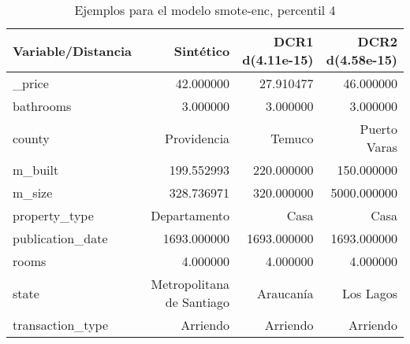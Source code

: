 \begin{table}[H]
\centering
\fontsize{10}{14}\selectfont
\caption{Ejemplos para el modelo smote-enc, percentil 4}
\label{table-example-economicos-b-3-smote-enc-4p}
\begin{tabular}{|l|r|r|r|}
\hline
\rowcolor[gray]{0.8}
Variable/Distancia & Sintético & DCR1 d(4.11e-15) & DCR2 d(4.58e-15) \\
\hline \_price & \cellcolor[rgb]{0.9, 0.54, 0.52} 42.000000 & 27.910477 & 46.000000 \\
\hline bathrooms & \cellcolor[rgb]{0.9, 0.54, 0.52} 3.000000 & \cellcolor[rgb]{0.9, 0.54, 0.52} 3.000000 & \cellcolor[rgb]{0.9, 0.54, 0.52} 3.000000 \\
\hline county & \cellcolor[rgb]{0.9, 0.54, 0.52} Providencia & Temuco & Puerto Varas \\
\hline m\_built & \cellcolor[rgb]{0.9, 0.54, 0.52} 199.552993 & 220.000000 & 150.000000 \\
\hline m\_size & \cellcolor[rgb]{0.9, 0.54, 0.52} 328.736971 & 320.000000 & 5000.000000 \\
\hline property\_type & \cellcolor[rgb]{0.9, 0.54, 0.52} Departamento & Casa & Casa \\
\hline publication\_date & \cellcolor[rgb]{0.9, 0.54, 0.52} 1693.000000 & \cellcolor[rgb]{0.9, 0.54, 0.52} 1693.000000 & \cellcolor[rgb]{0.9, 0.54, 0.52} 1693.000000 \\
\hline rooms & \cellcolor[rgb]{0.9, 0.54, 0.52} 4.000000 & \cellcolor[rgb]{0.9, 0.54, 0.52} 4.000000 & \cellcolor[rgb]{0.9, 0.54, 0.52} 4.000000 \\
\hline state & \cellcolor[rgb]{0.9, 0.54, 0.52} Metropolitana de Santiago & Araucanía & Los Lagos \\
\hline transaction\_type & \cellcolor[rgb]{0.9, 0.54, 0.52} Arriendo & \cellcolor[rgb]{0.9, 0.54, 0.52} Arriendo & \cellcolor[rgb]{0.9, 0.54, 0.52} Arriendo \\
\hline
\end{tabular}
\end{table}
